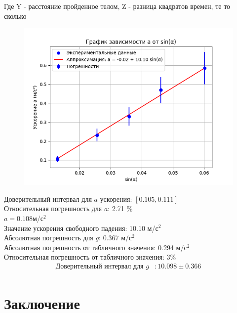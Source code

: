\documentclass[a4paper]{article}
\begin{document}
\begin{center}

Где Y - расстояние пройденное телом, Z - разница квадратов времен, те то сколько \\
\begin{figure}[H]
\begin{center}
\includegraphics[scale=0.5]{plot.png}\\
\end{center}
\end{figure}

Доверительный интервал для $a$ ускорения: $[0.105, 0.111]$ \\
Относительная погрешность для $a$: 2.71 \%\\
$a = 0.108$м/с$^2$\\
Значение ускорения свободного падения: 10.10 м/с$^2$\\
Абсолютная погрешность для $g$: 0.367 м/с$^2$\\
Абсолютная погрешность от табличного значения: 0.294 м/с$^2$\\
Относительная погрешность от табличного значения: 3\% \\
\begin{align*}
\text{Доверительный интервал для } g &: 10.098 \pm 0.366 \\
\end{align*}
\end{center}

\section{Заключение}
\end{document}
